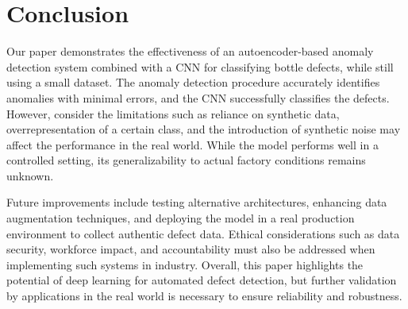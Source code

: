\section{Conclusion}

Our paper demonstrates the effectiveness of an autoencoder-based anomaly detection system combined with a CNN for classifying bottle defects, while still using a small dataset.
The anomaly detection procedure accurately identifies anomalies with minimal errors, and the CNN successfully classifies the defects. 
However, consider the limitations such as reliance on synthetic data, overrepresentation of a certain class, and the introduction of synthetic noise may affect the performance in the real world.
While the model performs well in a controlled setting, its generalizability to actual factory conditions remains unknown.

Future improvements include testing alternative architectures, enhancing data augmentation techniques, and deploying the model in a real production environment to collect authentic defect data. 
Ethical considerations such as data security, workforce impact, and accountability must also be addressed when implementing such systems in industry. 
Overall, this paper highlights the potential of deep learning for automated defect detection, but further validation by applications in the real world is necessary to ensure reliability and robustness.